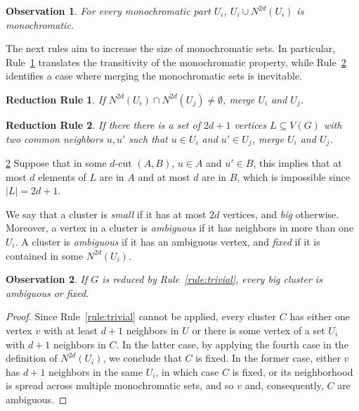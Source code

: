 \documentclass[a4paper,UKenglish,cleveref, autoref]{lipics-v2019}
\newtheorem{rrule}{Reduction Rule}
\newtheorem{observation}{Observation}
\newcommand{\tdef}[1]{\emph{#1}}
\begin{document}
\begin{observation}
    For every monochromatic part $U_i$, $U_i \cup N^{2d}(U_i)$ is monochromatic.
\end{observation}

The next rules aim to increase the size of monochromatic sets.
In particular, Rule~\ref{rule:transitivity} translates the transitivity of the monochromatic property, while Rule~\ref{rule:attraction} identifies a case where merging the monochromatic sets is inevitable.

\begin{rrule}
    \label{rule:transitivity}
    If $N^{2d}(U_i) \cap N^{2d}(U_j) \neq \emptyset$, merge $U_i$ and $U_j$.
\end{rrule}

\begin{rrule}
    \label{rule:attraction}
    If there there is a set of $2d+1$ vertices $L \subseteq V(G)$ with two common neighbors $u,u'$ such that $u \in U_i$ and $u' \in U_j$, merge $U_i$ and $U_j$.
\end{rrule}

\begin{sproof}{\ref{rule:attraction}}
    Suppose that in some $d$-cut $(A, B)$, $u \in A$ and $u' \in B$, this implies that at most $d$ elements of $L$ are in $A$ and at most $d$ are in $B$, which is impossible since $|L| = 2d+1$.
\end{sproof}

We say that a cluster is \textit{small} if it has at most $2d$ vertices, and \textit{big} otherwise.
Moreover, a vertex in a cluster is \textit{ambiguous} if it has neighbors in more than one $U_i$.
A cluster is \tdef{ambiguous} if it has an ambiguous vertex, and \tdef{fixed} if it is contained in some $N^{2d}(U_i)$.

\begin{observation}
    \label{obs:fix_amb}
    If $G$ is reduced by Rule~\ref{rule:trivial}, every big cluster is ambiguous or fixed.
\end{observation}

\begin{proof}
    Since Rule~\ref{rule:trivial} cannot be applied, every cluster $C$ has either one vertex $v$ with at least $d + 1$ neighbors in $U$ or there is some vertex of a set $U_i$ with $d + 1$ neighbors in $C$.
    In the latter case, by applying the fourth case in the definition of $N^{2d}(U_i)$, we conclude that $C$ is fixed.
    In the former case, either $v$ has $d+1$ neighbors in the same $U_i$, in which case $C$ is fixed, or its neighborhood is spread across multiple monochromatic sets, and so $v$ and, consequently, $C$ are ambiguous.
\end{proof}
\end{document}
